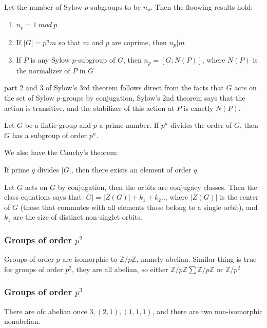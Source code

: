 \documentclass[main.tex]{subfiles}
\begin{document}
\begin{theorem}
Let the number of Sylow $p$-subgroups to be $n_p$. Then the floowing results hold:
\begin{enumerate}
    \item $n_p = 1\ mod\ p$
    \item If $|G| = p^n m$ so that $m$ and $p$ are coprime, then $n_p | m$
    \item If $P$ is any Sylow $p$-subgroup of $G$, then $n_p = [G: N(P)]$, where $N(P)$ is the normalizer of $P$ in $G$
\end{enumerate}


\end{theorem}
\begin{remark}
part 2 and 3 of Sylow's 3rd theorem follows direct from  the facts that $G$ acts on the set of Sylow $p$-groups by conjugation, Sylow's 2nd theorem says that the action is transitive, and the stabilizer of this action at $P$ is exactly $N(P)$.
\end{remark}
\begin{corollary}
Let $G$ be a fintie group and $p$ a prime number. If $p^n$ divides the order of $G$, then $G$ has a subgroup of order $p^n$.
\end{corollary}

We also have the Cauchy's theorem:

\begin{theorem}
If prime $q$ divides $|G|$, then there exists an element of order $q$.
\end{theorem}

Let $G$ acts on $G$ by conjugation, then the orbits are conjugacy classes. 
Then the class equations says that $|G| = |Z(G)| + k_1 + k_2 ..$, where $|Z(G)|$ is the center of $G$ (those that commutes with all elements those belong to a single orbit), and $k_1$ are the size of distinct non-singlet orbits.


\subsubsection{Groups of order $p^2$}
Groups of order $p$ are isomorphic to $\mathbb{Z}/p\mathbb{Z}$, namely abelian. Similar thing is true for groups of order $p^2$, they are all abelian, so either $\mathbb{Z}/p\mathbb{Z} \sum \mathbb{Z}/p\mathbb{Z}$ or $\mathbb{Z}/p^2$

\subsubsection{Groups of order $p^3$}
There are ofc abelian once $3, (2,1), (1,1,1)$, and there are two non-isomorphic nonabelian. 
\end{document}
